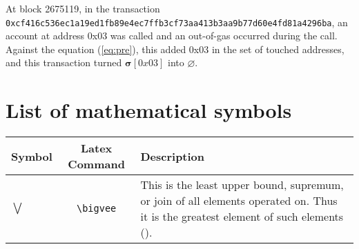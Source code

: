 \documentclass[9pt,oneside]{amsart}
\begin{document}
At block 2675119, in the transaction \texttt{0xcf416c536ec1a19ed1fb89e4ec7ffb3cf73aa413b3aa9b77d60e4fd81a4296ba}, an account at address 0x03 was called and an out-of-gas occurred during the call. Against the equation (\ref{eq:pre}), this added 0x03 in the set of touched addresses, and this transaction turned $\boldsymbol{\sigma}[0x03]$ into $\varnothing$.

\section{List of mathematical symbols}\label{app:symbols}
\begin{tabularx}{\textwidth}{lcX}
\toprule
Symbol & Latex Command & Description \\
\midrule
\hypertarget{bigvee}{}
$\bigvee$ & \verb|\bigvee| & This is the least upper bound, supremum, or join of all elements operated on. Thus it is the greatest element of such elements (\cite{Davey2002_zbMATH01748069}).\\
\bottomrule
\end{tabularx}
\end{document}
